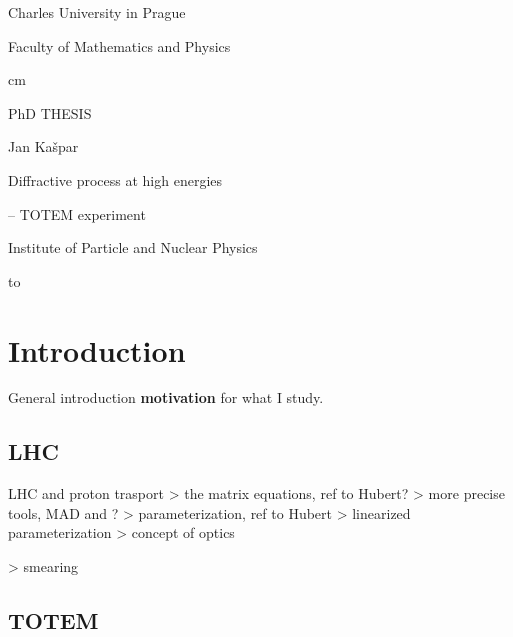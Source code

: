 






\let\BiggerFonts\SetFontSizesXII
\let\NormalFonts\SetFontSizesX
\let\SmallerFonts\SetFontSizesVIII

\NormalFonts

\ParIndent=5mm

\Reftrue
\Toctrue

\ShowLabelstrue \advance\hoffset-1cm


\centerline{\fPbxiv Charles University in Prague}
\centerline{\fPbxiv Faculty of Mathematics and Physics}
	cm
\centerline{\fPbxx PhD THESIS}
\vskip1cm
\centerline{}
\vskip3cm
\centerline{\fPbxiv Jan Ka\v spar}
\vskip1cm
\centerline{\fPbxx Diffractive process at high energies}
\centerline{\fPbxx -- TOTEM experiment}
\vskip2cm
\centerline{\fPbxiv Institute of Particle and Nuclear Physics}
\ialign to

\vfil\eject\forceoddpage


\InsertToc


\BeginText

\chapter{Introduction}

\> General introduction
\> {\bf motivation} for what I study.

\section{LHC}

\> LHC and proton trasport
\>> the matrix equations, ref to Hubert?
\>> more precise tools, MAD and ?
\>> parameterization, ref to Hubert
\>> linearized parameterization
\>> concept of optics

\>> smearing

\section{TOTEM}

